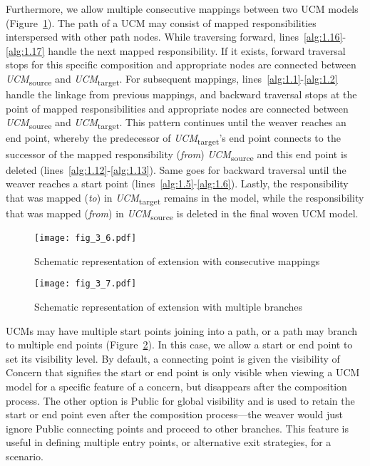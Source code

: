 Furthermore, we allow multiple consecutive mappings between two UCM models (Figure~\ref{fig:3.6}). The path of a UCM may consist of mapped responsibilities interspersed with other path nodes. While traversing forward, lines~\ref{alg:1.16}-\ref{alg:1.17} handle the next mapped responsibility. If it exists, forward traversal stops for this specific composition and appropriate nodes are connected between \emph{UCM}\textsubscript{source} and \emph{UCM}\textsubscript{target}. For subsequent mappings, lines~\ref{alg:1.1}-\ref{alg:1.2} handle the linkage from previous mappings, and backward traversal stops at the point of mapped responsibilities and appropriate nodes are connected between \emph{UCM}\textsubscript{source} and \emph{UCM}\textsubscript{target}. This pattern continues until the weaver reaches an end point, whereby the predecessor of \emph{UCM}\textsubscript{target}'s end point connects to the successor of the mapped responsibility (\emph{from}) \emph{UCM}\textsubscript{source} and this end point is deleted (lines~\ref{alg:1.12}-\ref{alg:1.13}). Same goes for backward traversal until the weaver reaches a start point (lines~\ref{alg:1.5}-\ref{alg:1.6}). Lastly, the responsibility that was mapped (\emph{to}) in \emph{UCM}\textsubscript{target} remains in the model, while the responsibility that was mapped (\emph{from}) in \emph{UCM}\textsubscript{source} is deleted in the final woven UCM model.

\begin{figure}
	\centering
	\texttt{[image: fig\_3\_6.pdf]}
	\caption{Schematic representation of extension with consecutive mappings}
	\label{fig:3.6}
\end{figure}

\begin{figure}[h]
	\centering
	\texttt{[image: fig\_3\_7.pdf]}
	\caption{Schematic representation of extension with multiple branches}
	\label{fig:3.7}
\end{figure}

UCMs may have multiple start points joining into a path, or a path may branch to multiple end points (Figure~\ref{fig:3.7}). In this case, we allow a start or end point to set its visibility level. By default, a connecting point is given the visibility of {\cls Concern} that signifies the start or end point is only visible when viewing a UCM model for a specific feature of a concern, but disappears after the composition process. The other option is {\cls Public} for global visibility and is used to retain the start or end point even after the composition process---the weaver would just ignore {\cls Public} connecting points and proceed to other branches. This feature is useful in defining multiple entry points, or alternative exit strategies, for a scenario.

